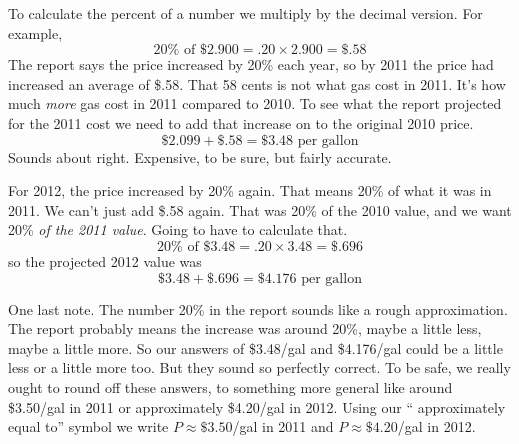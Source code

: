 To calculate the percent of a number we multiply by the decimal version.  For example,
$$20\% \text{ of } \$2.900 = .20 \times 2.900 = \$.58$$
The report says the price increased by 20\% each year, so by 2011 the price had increased an average of \$.58.  That 58 cents is not what gas cost in 2011.  It's how much \emph{more} gas cost in 2011 compared to 2010.  To see what the report projected for the 2011 cost we need to add that increase on to the original 2010 price.
$$\$2.099 + \$.58= \$3.48\text{ per gallon}$$
Sounds about right.  Expensive, to be sure, but fairly accurate.

For 2012, the price increased by 20\% again.  That means 20\% of what it was in 2011.  We can't just add \$.58 again.  That was 20\% of the 2010 value, and we want 20\% \emph{of the 2011 value}.  Going to have to calculate that.
$$20\% \text{ of } \$3.48 = .20 \times 3.48 = \$.696$$
so the projected 2012 value was $$\$3.48 + \$.696= \$4.176\text{ per gallon}$$

One last note.  The number 20\% in the report sounds like a rough approximation.  The report probably means the increase was around 20\%, maybe a little less, maybe a little more.  So our answers of \$3.48/gal and \$4.176/gal could be a little less or a little more too.  But they sound so perfectly correct.  To be safe, we really ought to round off these answers, to something more general like around \$3.50/gal in 2011 or approximately \$4.20/gal in 2012.  Using our `` approximately equal to''  symbol we write  $P \approx \$3.50$/gal in 2011 and $P \approx \$4.20$/gal in 2012.  


  